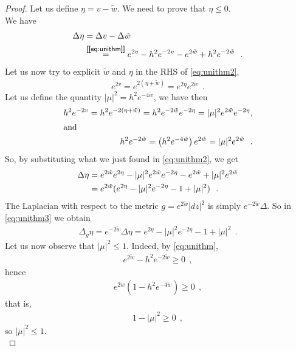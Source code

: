 \documentclass[a4paper,11pt,openright,twoside]{book}
\newcommand{\1}{\mathds{1}}
\newcommand{\commb}[1]{\textsf{{\footnotesize[#1]}}}
\theoremstyle{plain}
\theoremstyle{definition}
\theoremstyle{remark}
\begin{document}
\begin{proof}
	Let us define $\eta = v- \tilde w$. We need to prove that $\eta \leq 0$.\\
	We have
	\begin{align}
	\Delta \eta &= \Delta v - \Delta \tilde w\notag\\
			& \overset{\commb{\eqref{eq:unithm}}}{=} e^{2 v}- h^2 e^{-2v} -e^{2\tilde w} + h^2e^{-2\tilde w}\label{eq:unithm2}
	\ \ .
	\end{align}
	Let us now try to explicit $\tilde w$ and $\eta$ in the RHS of  \eqref{eq:unithm2},
	\begin{align*}
		e^{2v} = e^{2(\eta + \tilde w) } = e^{2\eta}e^{2\tilde w}
		\ \ .
	\end{align*}
	Let us define the quantity $|\mu|^2 = h^2 e^{-4\tilde w}$, we have then
	\begin{align*}
		h^2 e^{-2v} =h^2 e^{-2(\eta+\tilde w)}= h^2 e^{-2\tilde w}e^{-2\eta} = |\mu|^2e^{2\tilde w}e^{-2\eta},\\
		\shortintertext{and}
		h^2 e^{-2\tilde w} = \left( h^2 e^{-4\tilde w}\right)  e^{2\tilde w}		= |\mu|^2e^{2\tilde w}
	\ \ .
	\end{align*}
	So, by substituting what we just found in \eqref{eq:unithm2}, we get
	\begin{align}
		\Delta \eta &= e^{2\tilde w} e^{2\eta}-|\mu|^2 e^{2\tilde w} e^{-2\eta} -e^{2 \tilde w} + |\mu|^{2}e^{2\tilde w}\notag\\
			&= e^{2\tilde w}(e^{2\eta} -|\mu|^2 e^{-2\eta}-1+|\mu|^2)\label{eq:unithm3}
	\ \ .
	\end{align}
	The Laplacian with respect to the metric $g=e^{2\tilde w}|dz|^2$ is simply $e^{-2\tilde w}\Delta$. So in \eqref{eq:unithm3} we obtain 
	\begin{align}\label{eq:unithm5}
		\Delta_g \eta =e^{-2\tilde w}\Delta \eta = e^{2\eta}-|\mu|^2 e^{-2\eta}-1+|\mu|^2
	\ \ .
	\end{align}
	Let us now observe that $|\mu|^2\leq 1$. Indeed, by \eqref{eq:unithm},
	\begin{align*}
		e^{2\tilde w}-h^2e^{-2\tilde w} \geq 0
		\ \ ,
	\end{align*}
	hence
	\begin{align*}
		e^{2\tilde w}(1-h^2e^{-4\tilde w}) \geq 0
		\ \ ,
	\end{align*}
	that is,
	\begin{align*}
		1-|\mu|^2 \geq 0
		\ \ ,
	\end{align*}
	so $|\mu|^2\leq 1$.\\

\end{proof}
\end{document}

